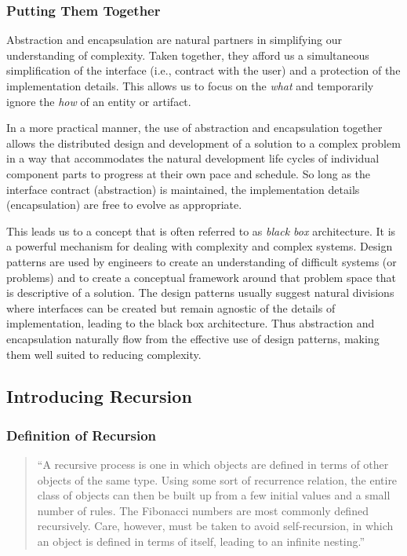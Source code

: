 \documentclass[jou,apacite]{apa6}
\begin{document}
\subsubsection{Putting Them Together}
Abstraction and encapsulation are natural partners in simplifying our understanding of complexity.  Taken together, they afford us a simultaneous simplification of the interface (i.e., contract with the user) and a protection of the implementation details.  This allows us to focus on the \emph{what} and temporarily ignore the \emph{how} of an entity or artifact.

In a more practical manner, the use of abstraction and encapsulation together allows the distributed design and development of a solution to a complex problem in a way that accommodates the natural development life cycles of individual component parts to progress at their own pace and schedule.  So long as the interface contract (abstraction) is maintained, the implementation details (encapsulation) are free to evolve as appropriate.

This leads us to a concept that is often referred to as \emph{black box} architecture.  It is a powerful mechanism for dealing with complexity and complex systems.  Design patterns are used by engineers to create an understanding of difficult systems (or problems) and to create a conceptual framework around that problem space that is descriptive of a solution.  The design patterns usually suggest natural divisions where interfaces can be created but remain agnostic of the details of implementation, leading to the black box architecture.  Thus abstraction and encapsulation naturally flow from the effective use of design patterns, making them well suited to reducing complexity.

\subsection{Introducing Recursion}  %
\subsubsection{Definition of Recursion} %
    \begin{quote}
      ``A recursive process is one in which objects are defined in terms of other objects of the same type. Using some sort of recurrence relation, the entire class of objects can then be built up from a few initial values and a small number of rules. The Fibonacci numbers are most commonly defined recursively. Care, however, must be taken to avoid self-recursion, in which an object is defined in terms of itself, leading to an infinite nesting.''~\cite{Wolfram}
    \end{quote}
\end{document}

